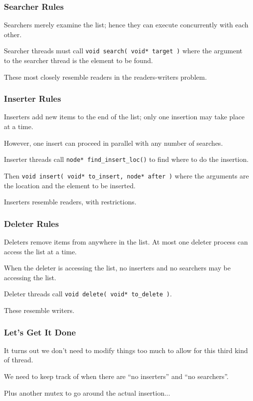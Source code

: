 \begin{frame}
	\frametitle{Searcher Rules}

	\alert{Searchers} merely examine the list; hence they can execute concurrently with each other.

	Searcher threads must call \texttt{void search( void* target )} where the argument to the searcher thread is the element to be found.

	These most closely resemble readers in the readers-writers problem.

\end{frame}

\begin{frame}
	\frametitle{Inserter Rules}

	\alert{Inserters} add new items to the end of the list; only one insertion may take place at a time.

	However, one insert can proceed in parallel with any number of searches.

	Inserter threads call \texttt{node* find\_insert\_loc()} to find where to do the insertion.

	Then \texttt{void insert( void* to\_insert, node* after )} where the arguments are the location and the element to be inserted.

	Inserters resemble readers, with restrictions.

\end{frame}


\begin{frame}
	\frametitle{Deleter Rules}

	\alert{Deleters} remove items from anywhere in the list. At most one deleter process can access the list at a time.

	When the deleter is accessing the list, no inserters and no searchers may be accessing the list.

	Deleter threads call \texttt{void delete( void* to\_delete )}.

	These resemble writers.

\end{frame}


\begin{frame}
	\frametitle{Let's Get It Done}

	It turns out we don't need to modify things too much to allow for this third kind of thread.

	We need to keep track of when there are ``no inserters'' and ``no searchers''.

	Plus another mutex to go around the actual insertion...

\end{frame}


